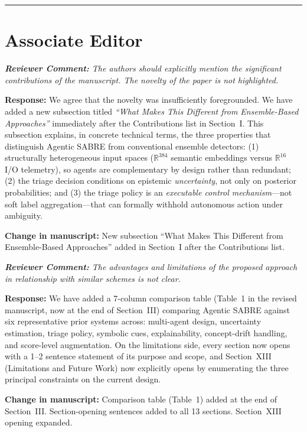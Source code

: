 \documentclass[11pt,a4paper]{article}
\newcommand{\RC}[1]{\begin{reviewbox}\textit{\textbf{Reviewer Comment:} #1}\end{reviewbox}}
\newcommand{\RS}[1]{\noindent\textcolor{responsegreen}{\textbf{Response:}} #1\par\medskip}
\newcommand{\CH}[1]{\noindent\textcolor{changebrown}{\textbf{Change in manuscript:}} #1\par\bigskip}
\begin{document}
\bigskip
\hrule
\bigskip

\section{Associate Editor}

\RC{The authors should explicitly mention the significant contributions of the
manuscript. The novelty of the paper is not highlighted.}

\RS{We agree that the novelty was insufficiently foregrounded. We have added a new
subsection titled \textit{``What Makes This Different from Ensemble-Based Approaches''}
immediately after the Contributions list in Section~I. This subsection explains,
in concrete technical terms, the three properties that distinguish Agentic SABRE
from conventional ensemble detectors: (1) structurally heterogeneous input spaces
($\mathbb{R}^{384}$ semantic embeddings versus $\mathbb{R}^{16}$ I/O telemetry),
so agents are complementary by design rather than redundant; (2) the triage decision
conditions on epistemic \emph{uncertainty}, not only on posterior probabilities;
and (3) the triage policy is an \emph{executable control mechanism}---not soft label
aggregation---that can formally withhold autonomous action under ambiguity.}

\CH{New subsection ``What Makes This Different from Ensemble-Based Approaches''
added in Section~I after the Contributions list.}

\RC{The advantages and limitations of the proposed approach in relationship with
similar schemes is not clear.}

\RS{We have added a 7-column comparison table (Table~1 in the revised manuscript,
now at the end of Section~III) comparing Agentic SABRE against six representative
prior systems across: multi-agent design, uncertainty estimation, triage policy,
symbolic cues, explainability, concept-drift handling, and score-level augmentation.
On the limitations side, every section now opens with a 1--2 sentence statement of
its purpose and scope, and Section~XIII (Limitations and Future Work) now explicitly
opens by enumerating the three principal constraints on the current design.}

\CH{Comparison table (Table~1) added at the end of Section~III. Section-opening
sentences added to all 13 sections. Section~XIII opening expanded.}
\end{document}
